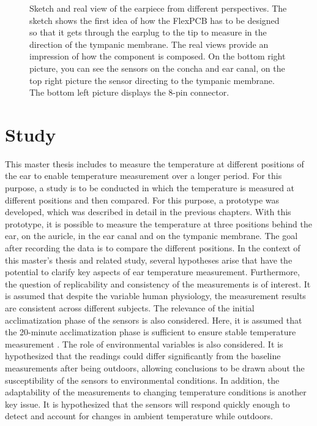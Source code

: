 \begin{figure}[!h]
    \caption{Sketch and real view of the earpiece from different perspectives.
The sketch shows the first idea of how the FlexPCB has to be designed so that it gets through the earplug to the tip to measure in the direction of the tympanic membrane. The real views provide an impression of how the component is composed. On the bottom right picture, you can see the sensors on the concha and ear canal, on the top right picture the sensor directing to the tympanic membrane. The bottom left picture displays the 8-pin connector.}
    \label{fig:design:prototype_earpiece_views}
\end{figure}

\section{Study}
\label{ch:Design:Study}
This master thesis includes to measure the temperature at different positions of the ear to enable temperature measurement over a longer period. 
For this purpose, a study is to be conducted in which the temperature is measured at different positions and then compared. 
For this purpose, a prototype was developed, which was described in detail in the previous chapters. 
With this prototype, it is possible to measure the temperature at three positions behind the ear, on the auricle, in the ear canal and on the tympanic membrane.
The goal after recording the data is to compare the different positions. 
In the context of this master's thesis and related study, several hypotheses arise that have the potential to clarify key aspects of ear temperature measurement.
Furthermore, the question of replicability and consistency of the measurements is of interest. 
It is assumed that despite the variable human physiology, the measurement results are consistent across different subjects. 
The relevance of the initial acclimatization phase of the sensors is also considered. 
Here, it is assumed that the 20-minute acclimatization phase is sufficient to ensure stable temperature measurement \cite{chagllae.MeasurementCoreBody2018}. 
The role of environmental variables is also considered. 
It is hypothesized that the readings could differ significantly from the baseline measurements after being outdoors, allowing conclusions to be drawn about the susceptibility of the sensors to environmental conditions. 
In addition, the adaptability of the measurements to changing temperature conditions is another key issue. 
It is hypothesized that the sensors will respond quickly enough to detect and account for changes in ambient temperature while outdoors.
